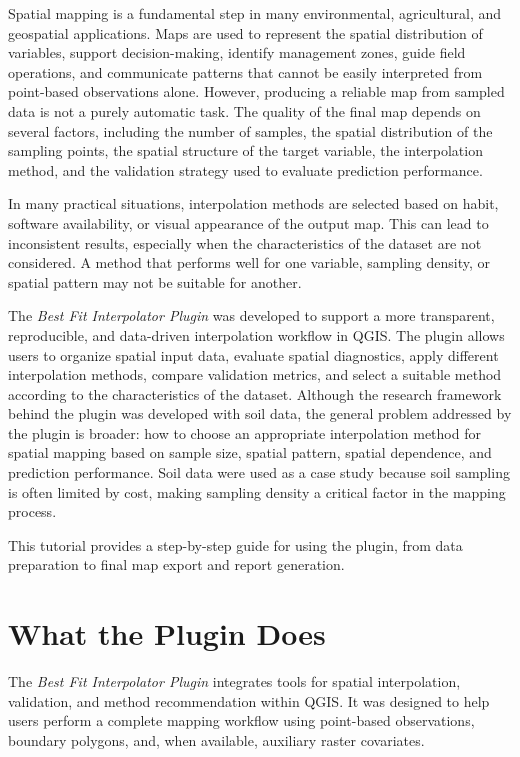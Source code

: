 \documentclass[11pt,a4paper]{article}
\begin{document}
Spatial mapping is a fundamental step in many environmental, agricultural, and geospatial applications. Maps are used to represent the spatial distribution of variables, support decision-making, identify management zones, guide field operations, and communicate patterns that cannot be easily interpreted from point-based observations alone. However, producing a reliable map from sampled data is not a purely automatic task. The quality of the final map depends on several factors, including the number of samples, the spatial distribution of the sampling points, the spatial structure of the target variable, the interpolation method, and the validation strategy used to evaluate prediction performance.

In many practical situations, interpolation methods are selected based on habit, software availability, or visual appearance of the output map. This can lead to inconsistent results, especially when the characteristics of the dataset are not considered. A method that performs well for one variable, sampling density, or spatial pattern may not be suitable for another.

The \textit{Best Fit Interpolator Plugin} was developed to support a more transparent, reproducible, and data-driven interpolation workflow in QGIS. The plugin allows users to organize spatial input data, evaluate spatial diagnostics, apply different interpolation methods, compare validation metrics, and select a suitable method according to the characteristics of the dataset. Although the research framework behind the plugin was developed with soil data, the general problem addressed by the plugin is broader: how to choose an appropriate interpolation method for spatial mapping based on sample size, spatial pattern, spatial dependence, and prediction performance. Soil data were used as a case study because soil sampling is often limited by cost, making sampling density a critical factor in the mapping process.

This tutorial provides a step-by-step guide for using the plugin, from data preparation to final map export and report generation.

\section{What the Plugin Does}

The \textit{Best Fit Interpolator Plugin} integrates tools for spatial interpolation, validation, and method recommendation within QGIS. It was designed to help users perform a complete mapping workflow using point-based observations, boundary polygons, and, when available, auxiliary raster covariates.
\end{document}

